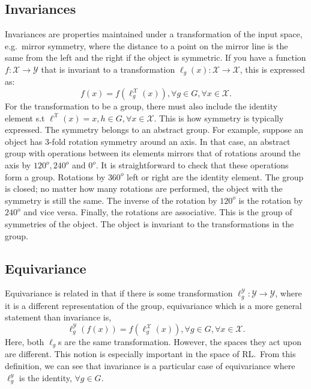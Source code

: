 \subsection{Invariances}
Invariances are properties maintained under a transformation of the input space, e.g.\ mirror symmetry, where the distance to a point on the mirror line is the same from the left and the right if the object is symmetric. If you have a function $f: \mathcal{X} \rightarrow \mathcal{Y}$ that is invariant to a transformation $\ell_g(x): \mathcal{X} \rightarrow \mathcal{X}$, this is expressed as:
\begin{equation}
	f(x) = f(\ell^\mathcal{X}_g(x)),   \forall g \in G, \forall x \in \mathcal{X}.
\end{equation}
For the transformation to be a group, there must also include the identity element s.t $\ell^\mathcal{X}(x) = x,  h \in G, \forall x\in \mathcal{X}$. This is how symmetry is typically expressed. The symmetry belongs to an abstract group. For example, suppose an object has 3-fold rotation symmetry around an axis. In that case, an abstract group with operations between its elements mirrors that of rotations around the axis by $120^o, 240^o$ and $0^o$. It is straightforward to check that these operations form a group. Rotations by $360^o$ left or right are the identity element. The group is closed; no matter how many rotations are performed, the object with the symmetry is still the same. The inverse of the rotation by $120^o$ is the rotation by $240^o$ and vice versa. Finally, the rotations are associative. This is the group of symmetries of the object. The object is invariant to the transformations in the group.

\subsection{Equivariance}
Equivariance is related in that if there is some transformation $\ell_g^\mathcal{Y}: \mathcal{Y} \rightarrow \mathcal{Y}$, where it is a different representation of the group, equivariance which is a more general statement than invariance is,
\begin{equation}
	\ell_g^\mathcal{Y}( f(x) )= f(\ell_g^\mathcal{X}( x)), \forall g \in G, \forall x \in \mathcal{X}.
\end{equation}
Here, both $\ell_g$s are the same transformation. However, the spaces they act upon are different. This notion is especially important in the space of RL.\ From this definition, we can see that invariance is a particular case of equivariance where $\ell^y_g$ is the identity, $\forall g \in G$.
